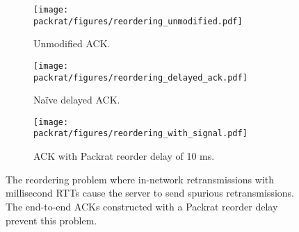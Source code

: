 \begin{figure}
    \centering
    \begin{subfigure}[b]{0.8\linewidth}
        \texttt{[image: packrat/figures/reordering\_unmodified.pdf]}
        \caption{Unmodified ACK.}
        \label{fig:packrat:reordering:unmodified}
    \end{subfigure}
    \begin{subfigure}[b]{0.8\linewidth}
        \texttt{[image: packrat/figures/reordering\_delayed\_ack.pdf]}
        \caption{Na\"ive delayed ACK.}
        \label{fig:packrat:reordering:delayed-ack}
    \end{subfigure}
    \begin{subfigure}[b]{0.8\linewidth}
        \texttt{[image: packrat/figures/reordering\_with\_signal.pdf]}
        \caption{ACK with Packrat reorder delay of 10 ms.}
        \label{fig:packrat:reordering:packrat}
    \end{subfigure}
    \caption{The reordering problem where in-network retransmissions with
    millisecond RTTs cause the server to send spurious retransmissions. The
    end-to-end ACKs constructed with a Packrat reorder delay prevent this problem.
    }
    \label{fig:packrat:reordering}
\end{figure}
